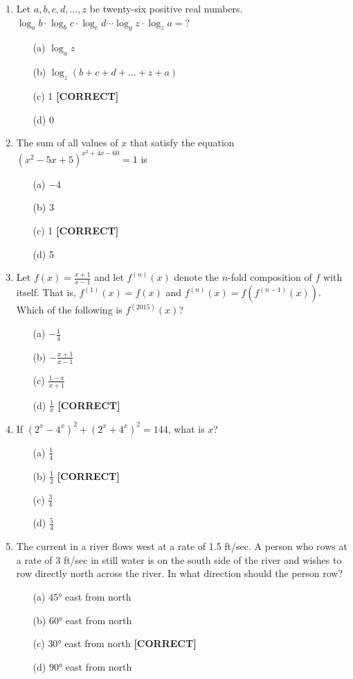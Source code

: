\documentclass[12pt]{article}
\begin{document}
\begin{enumerate}
\item Let $a, b, c, d, \ldots, z$ be twenty-six positive real numbers. $\log_a b \cdot \log_b c \cdot \log_c d \cdots \log_y z \cdot \log_z a = ?$
\begin{enumerate}
    \item[(a)] $\log_a z$
    \item[(b)] $\log_z(b + c + d + \ldots + z + a)$
    \item[(c)] 1 \quad \textbf{[CORRECT]}
    \item[(d)] 0
\end{enumerate}

\item The sum of all values of $x$ that satisfy the equation $(x^2 - 5x + 5)^{x^2 + 4x - 60} = 1$ is
\begin{enumerate}
    \item[(a)] $-4$
    \item[(b)] 3
    \item[(c)] 1 \quad \textbf{[CORRECT]}
    \item[(d)] 5
\end{enumerate}

\item Let $f(x) = \frac{x+1}{x-1}$ and let $f^{(n)}(x)$ denote the $n$-fold composition of $f$ with itself. That is, $f^{(1)}(x) = f(x)$ and $f^{(n)}(x) = f(f^{(n-1)}(x))$. Which of the following is $f^{(2015)}(x)$?
\begin{enumerate}
    \item[(a)] $-\frac{1}{4}$
    \item[(b)] $-\frac{x+1}{x-1}$
    \item[(c)] $\frac{1-x}{x+1}$
    \item[(d)] $\frac{1}{x}$ \quad \textbf{[CORRECT]}
\end{enumerate}

\item If $(2^x - 4^x)^2 + (2^x + 4^x)^2 = 144$, what is $x$?
\begin{enumerate}
    \item[(a)] $\frac{1}{4}$
    \item[(b)] $\frac{1}{2}$ \quad \textbf{[CORRECT]}
    \item[(c)] $\frac{3}{4}$
    \item[(d)] $\frac{5}{4}$
\end{enumerate}

\item The current in a river flows west at a rate of 1.5 ft/sec. A person who rows at a rate of 3 ft/sec in still water is on the south side of the river and wishes to row directly north across the river. In what direction should the person row?
\begin{enumerate}
    \item[(a)] $45°$ east from north
    \item[(b)] $60°$ east from north
    \item[(c)] $30°$ east from north \quad \textbf{[CORRECT]}
    \item[(d)] $90°$ east from north
\end{enumerate}


\end{enumerate}
\end{document}
